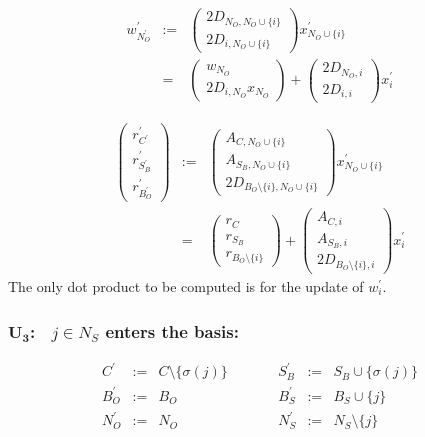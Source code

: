 \documentclass[a4paper]{article}
\begin{document}
\begin{eqnarray}
w_{N_{O}^{\prime}}^{\prime}
&:=&
\left(
\begin{array}{c}
2D_{N_{O}, N_{O} \cup \{i\}} \\
\hline
2D_{i, N_{O} \cup \{i\}}
\end{array}
\right)
x_{N_{O} \cup \{i\}}^{\prime}
\nonumber \\
&=&
\left(
\begin{array}{c}
w_{N_{O}} \\
\hline
2D_{i, N_{O}}x_{N_{O}}
\end{array}
\right)
+
\left(
\begin{array}{c}
2D_{N_{O}, i} \\
\hline
2D_{i, i}
\end{array}
\right)
x_{i}^{\prime}
\end{eqnarray}

\begin{eqnarray}
\left(
\begin{array}{c}
r_{C^{\prime}}^{\prime} \\
\hline
r_{S_{B}^{\prime}}^{\prime} \\
\hline
r_{B_{O}^{\prime}}^{\prime}
\end{array}
\right)
&:=&
\left(
\begin{array}{c}
A_{C, N_{O} \cup \{i\}} \\
\hline
A_{S_{B}, N_{O} \cup \{i\}} \\
\hline
2D_{B_{O} \setminus \{i\}, N_{O} \cup \{i\}} 
\end{array}
\right)
x_{N_{O} \cup \{i\}}^{\prime}
\nonumber \\
&=&
\left(
\begin{array}{c}
r_{C} \\
\hline
r_{S_{B}} \\
\hline
r_{B_{O} \setminus \{i\}}
\end{array}
\right)
+
\left(
\begin{array}{c}
A_{C, i} \\
\hline
A_{S_{B}, i} \\
\hline
2D_{B_{O} \setminus \{i\}, i}
\end{array}
\right)
x_{i}^{\prime}
\end{eqnarray}
The only dot product to be computed is for the update of $w_{i}^{\prime}$.

\subsubsection{$\mathbf{U_{3}}$:$\quad j \in N_{S}$ enters the basis:}
\begin{equation}
\label{update:slack_enters_basis}
\begin{array}{ccccccc}
C^{\prime}      &:=&  C \setminus \{\sigma(j)\}
&\quad\quad&
S_{B}^{\prime}  &:=&  S_{B} \cup \{\sigma(j)\}  \\
B_{O}^{\prime}  &:=&  B_{O}
&\quad\quad&
B_{S}^{\prime}  &:=&  B_{S} \cup \{j\}  \\
N_{O}^{\prime}  &:=&  N_{O}
&\quad\quad&
N_{S}^{\prime}  &:=&  N_{S} \setminus \{j\} 
\end{array}
\end{equation}
\end{document}

